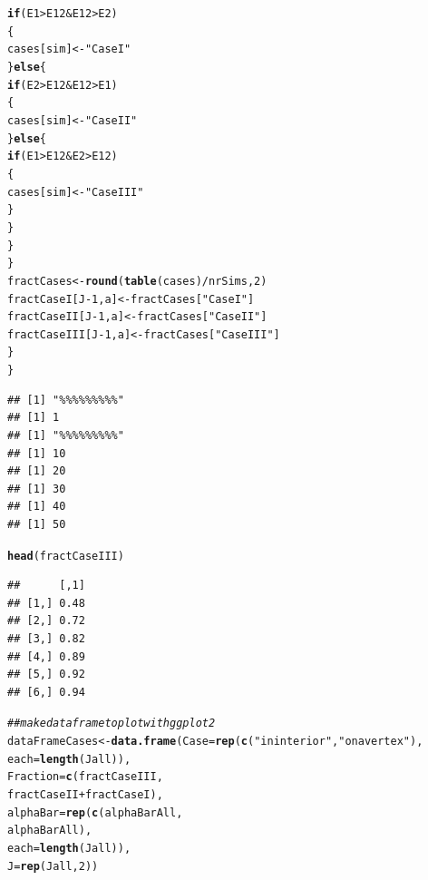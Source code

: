 \documentclass{article}\usepackage[]{graphicx}\usepackage[]{color}
\makeatletter
\newcommand{\hlnum}[1]{\textcolor[rgb]{0.686,0.059,0.569}{#1}}%
\newcommand{\hlstr}[1]{\textcolor[rgb]{0.192,0.494,0.8}{#1}}%
\newcommand{\hlcom}[1]{\textcolor[rgb]{0.678,0.584,0.686}{\textit{#1}}}%
\newcommand{\hlopt}[1]{\textcolor[rgb]{0,0,0}{#1}}%
\newcommand{\hlstd}[1]{\textcolor[rgb]{0.345,0.345,0.345}{#1}}%
\newcommand{\hlkwa}[1]{\textcolor[rgb]{0.161,0.373,0.58}{\textbf{#1}}}%
\newcommand{\hlkwb}[1]{\textcolor[rgb]{0.69,0.353,0.396}{#1}}%
\newcommand{\hlkwc}[1]{\textcolor[rgb]{0.333,0.667,0.333}{#1}}%
\newcommand{\hlkwd}[1]{\textcolor[rgb]{0.737,0.353,0.396}{\textbf{#1}}}%
\newenvironment{kframe}{%
 \def\at@end@of@kframe{}%
 \ifinner\ifhmode%
  \def\at@end@of@kframe{\end{minipage}}%
  \begin{minipage}{\columnwidth}%
 \fi\fi%
 \def\FrameCommand##1{\hskip\@totalleftmargin \hskip-\fboxsep
 \colorbox{shadecolor}{##1}\hskip-\fboxsep
     \hskip-\linewidth \hskip-\@totalleftmargin \hskip\columnwidth}%
 \MakeFramed {\advance\hsize-\width
   \@totalleftmargin\z@ \linewidth\hsize
   \@setminipage}}%
 {\par\unskip\endMakeFramed%
 \at@end@of@kframe}
\newenvironment{knitrout}{}{} %
\makeatother
\begin{document}
\begin{knitrout}
\begin{kframe}
\begin{alltt}
        \hlkwa{if}\hlstd{(E1} \hlopt{>} \hlstd{E12} \hlopt{&} \hlstd{E12} \hlopt{>} \hlstd{E2)}
          \hlstd{\{}
            \hlstd{cases[sim]} \hlkwb{<-} \hlstr{"Case I"}
          \hlstd{\}} \hlkwa{else} \hlstd{\{}
            \hlkwa{if}\hlstd{(E2} \hlopt{>} \hlstd{E12} \hlopt{&} \hlstd{E12} \hlopt{>} \hlstd{E1)}
              \hlstd{\{}
                \hlstd{cases[sim]} \hlkwb{<-} \hlstr{"Case II"}
              \hlstd{\}} \hlkwa{else} \hlstd{\{}
                \hlkwa{if}\hlstd{(E1} \hlopt{>} \hlstd{E12} \hlopt{&} \hlstd{E2} \hlopt{>} \hlstd{E12)}
                  \hlstd{\{}
                    \hlstd{cases[sim]} \hlkwb{<-} \hlstr{"Case III"}
                  \hlstd{\}}
              \hlstd{\}}
          \hlstd{\}}
      \hlstd{\}}
      \hlstd{fractCases} \hlkwb{<-} \hlkwd{round}\hlstd{(}\hlkwd{table}\hlstd{(cases)}\hlopt{/}\hlstd{nrSims,} \hlnum{2}\hlstd{)}
      \hlstd{fractCaseI[J}\hlopt{-}\hlnum{1}\hlstd{, a]} \hlkwb{<-} \hlstd{fractCases[}\hlstr{"Case I"}\hlstd{]}
      \hlstd{fractCaseII[J}\hlopt{-}\hlnum{1}\hlstd{, a]} \hlkwb{<-} \hlstd{fractCases[}\hlstr{"Case II"}\hlstd{]}
      \hlstd{fractCaseIII[J}\hlopt{-}\hlnum{1}\hlstd{, a]} \hlkwb{<-} \hlstd{fractCases[}\hlstr{"Case III"}\hlstd{]}
    \hlstd{\}}
\hlstd{\}}
\end{alltt}
\begin{verbatim}
## [1] "%%%%%%%%%"
## [1] 1
## [1] "%%%%%%%%%"
## [1] 10
## [1] 20
## [1] 30
## [1] 40
## [1] 50
\end{verbatim}
\begin{alltt}
\hlkwd{head}\hlstd{(fractCaseIII)}
\end{alltt}
\begin{verbatim}
##      [,1]
## [1,] 0.48
## [2,] 0.72
## [3,] 0.82
## [4,] 0.89
## [5,] 0.92
## [6,] 0.94
\end{verbatim}
\begin{alltt}
\hlcom{##make data frame to plot with ggplot2}
\hlstd{dataFrameCases} \hlkwb{<-} \hlkwd{data.frame}\hlstd{(}\hlkwc{Case}\hlstd{=}\hlkwd{rep}\hlstd{(}\hlkwd{c}\hlstd{(}\hlstr{"in interior"}\hlstd{,} \hlstr{"on a vertex"}\hlstd{),}
                                      \hlkwc{each}\hlstd{=}\hlkwd{length}\hlstd{(Jall)),}
                             \hlkwc{Fraction}\hlstd{=}\hlkwd{c}\hlstd{(fractCaseIII,}
                                        \hlstd{fractCaseII}\hlopt{+}\hlstd{fractCaseI),}
                             \hlkwc{alphaBar}\hlstd{=}\hlkwd{rep}\hlstd{(}\hlkwd{c}\hlstd{(alphaBarAll,}
                                            \hlstd{alphaBarAll),}
                                          \hlkwc{each}\hlstd{=}\hlkwd{length}\hlstd{(Jall)),}
                             \hlkwc{J} \hlstd{=} \hlkwd{rep}\hlstd{(Jall,} \hlnum{2}\hlstd{))}


\end{alltt}
\end{kframe}
\end{knitrout}
\end{document}
